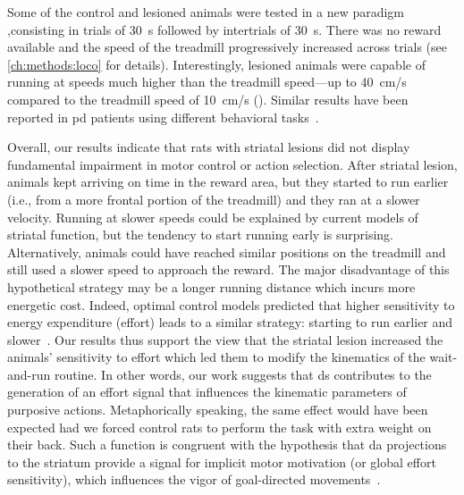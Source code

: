 Some of the control and lesioned animals were tested in a new paradigm ,consisting in trials of 30~s followed by intertrials of 30~s.
There was no reward available and the speed of the treadmill progressively increased across trials (see \autoref{ch:methods:loco} for details).
Interestingly, lesioned animals were capable of running at speeds much higher than the treadmill speed---up to 40~cm/s compared to the treadmill speed of 10~cm/s ().
Similar results have been reported in \gls{pd} patients using different behavioral tasks~\cite{Mazzoni2007, Schmidt2008Brain}.
\par
Overall, our results indicate that rats with striatal lesions did not display fundamental impairment in motor control or action selection.
After striatal lesion, animals kept arriving on time in the reward area, but they started to run earlier (i.e., from a more frontal portion of the treadmill) and they ran at a slower velocity.
Running at slower speeds could be explained by current models of striatal function, but the tendency to start running early is surprising.
Alternatively, animals could have reached similar positions on the treadmill and still used a slower speed to approach the reward.
The major disadvantage of this hypothetical strategy may be a longer running distance which incurs more energetic cost.
Indeed, optimal control models predicted that higher sensitivity to energy expenditure (effort) leads to a similar strategy: starting to run earlier and slower~\cite{JuradoParras2020}.
Our results thus support the view that the striatal lesion increased the animals' sensitivity to effort which led them to modify the kinematics of the wait-and-run routine.
In other words, our work suggests that \gls{ds} contributes to the generation of an effort signal that influences the kinematic parameters of purposive actions.
Metaphorically speaking, the same effect would have been expected had we forced control rats to perform the task with extra weight on their back.
Such a function is congruent with the hypothesis that \gls{da} projections to the striatum provide a signal for implicit motor motivation (or global effort sensitivity), which influences the vigor of goal-directed movements~\cite{Mazzoni2007}.
\par





